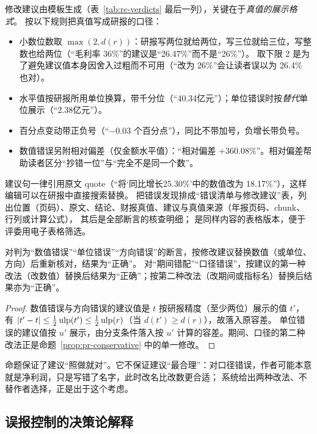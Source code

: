 修改建议由模板生成（表~\ref{tab:rc-verdicts} 最后一列），关键在于\emph{真值的展示格式}。 按以下规则把真值写成研报的口径：
\begin{itemize}
\item 小数位数取 $\max(2, d(r))$：研报写两位就给两位，写三位就给三位，写整数也给两位（“毛利率 36\%”的建议是“26.47\%”而不是“26\%”）。
  取下限 2 是为了避免建议值本身因舍入过粗而不可用（“改为 26\%”会让读者误以为 26.4\% 也对）。
\item 水平值按研报所用单位换算，带千分位（“40.34亿元”）；单位错误时按\emph{替代}单位展示（“2.38亿元”）。
\item 百分点变动带正负号（“$-0.03$ 个百分点”），同比不带加号，负增长带负号。
\item 数值错误另附相对偏差（仅金额水平值）：“相对偏差 $+360.08\%$”。相对偏差帮助读者区分“抄错一位”与“完全不是同一个数”。
\end{itemize}

建议句一律引用原文 quote（“将‘同比增长25.30\%’中的数值改为 18.17\%”），这样编辑可以在研报中直接搜索替换。
 把错误发现排成“错误清单与修改建议”表，列出位置（页码）、原文、结论、财报真值、建议与真值来源（年报页码、chunk、行列或计算公式），
其后是全部断言的核查明细； 是同样内容的表格版本，便于评委用电子表格筛选。

\begin{proposition}[建议的可执行性]
\label{prop:rc-suggest}
对判为“数值错误”“单位错误”“方向错误”的断言，按修改建议替换数值（或单位、方向）后重新核对，结果为“正确”。
对“期间错配”“口径错误”，按建议的第一种改法（改数值）替换后结果为“正确”；按第二种改法（改期间或指标名）替换后结果亦为“正确”。
\end{proposition}
\begin{proof}
数值错误与方向错误的建议值是 $t$ 按研报精度（至少两位）展示的值 $t'$，有 $|t'-t|\le\tfrac12\operatorname{ulp}(t')\le\tfrac12\operatorname{ulp}(r)$（当 $d(t')\ge d(r)$），故落入原容差。
单位错误的建议值按 $u'$ 展示，由分支条件落入按 $u'$ 计算的容差。期间、口径的第二种改法正是命题~\ref{prop:pr-conservative} 中的单一修改。
\end{proof}

命题保证了建议“照做就对”。它不保证建议“最合理”：对口径错误，作者可能本意就是净利润，只是写错了名字，此时改名比改数更合适；
系统给出两种改法、不替作者选择，正是出于这个考虑。

\subsection{误报控制的决策论解释}
\label{sec:rc-decision}


